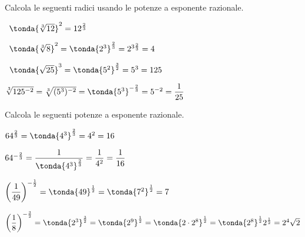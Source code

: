 \begin{esempio}
 Calcola le seguenti radici usando le potenze a esponente razionale.
 \begin{itemize*}
 \item~\(\tonda{\sqrt[3]{12}}^2=12^{\frac{2}{3}}\)
 \item~\(\tonda{\sqrt[3]{8}}^2=\tonda{2^3}^{\frac{2}{3}}=2^{3\frac{2}{3}}=4\)
 \item~\(\tonda{\sqrt{25}}^3=\tonda{5^2}^{\frac{3}{2}}=5^3=125\)
 \item \(\sqrt[3]{125^{-2}}=\sqrt[3]{(5^3)^{-2}}=
        \tonda{5^3}^{-\frac{2}{3}}=5^{-2}=\dfrac 1{25}\)
\end{itemize*}
\end{esempio}

\begin{esempio}
 Calcola le seguenti potenze a esponente razionale.
 \begin{itemize*}
 \item \(64^{\frac{2}{3}}=\tonda{4^3}^{\frac{2}{3}}=4^2=16\)
 \item \(64^{-\frac{2}{3}}=\dfrac{1}{\tonda{4^3}^{\frac{2}{3}}}=
   \dfrac{1}{4^2}=\dfrac{1}{16}\)
 \item \(\left(\dfrac 1{49}\right)^{-\frac{1}{2}}=
        \tonda{49}^{\frac{1}{2}}=\tonda{7^2}^{\frac{1}{2}}=7\)
 \item \(\left(\dfrac{1}{8}\right)^{-\frac{3}{2}}=
   \tonda{2^3}^{\frac{3}{2}}=
   \tonda{2^9}^\frac{1}{2}=
   \tonda{2 \cdot 2^8}^\frac{1}{2}=
   \tonda{2^8}^{\frac{1}{2}}2^{\frac{1}{2}}=2^4 \sqrt{2}\)
\end{itemize*}
\end{esempio}

